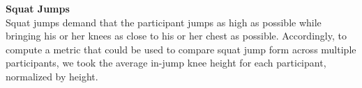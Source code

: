 \textbf{Squat Jumps} \\
Squat jumps demand that the participant jumps as high as possible while bringing his or her knees as close to his or her chest as possible. Accordingly, to compute a metric that could be used to compare squat jump form across multiple participants, we took the average in-jump knee height for each participant, normalized by height.

